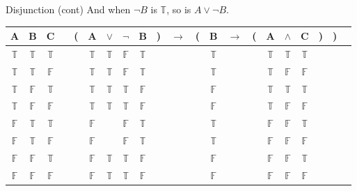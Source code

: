\documentclass[
  ignorenonframetext,
]{beamer}
\renewcommand{\,}{\text{, }}
\def\True{\mathbb{T}}
\def\False{\mathbb{F}}
\begin{document}
\begin{frame}{Disjunction (cont)}
\protect\hypertarget{disjunction-cont}{}
And when \(\neg B\) is \(\True\), so is \(A \vee \neg B\).

\begin{center}
\begin{tabular}{@{ }c@{ }@{ }c@{ }@{ }c | c@{ }@{}c@{}@{ }c@{ }@{ }c@{ }@{ }c@{ }@{ }c@{ }@{}c@{}@{ }c@{ }@{}c@{}@{ }c@{ }@{ }c@{ }@{}c@{}@{ }c@{ }@{ }c@{ }@{ }c@{ }@{}c@{}@{}c@{}@{ }c}
A & B & C &  & ( & A & $\vee$ & $\neg$ & B & ) & $\rightarrow$ & ( & B & $\rightarrow$ & ( & A & $\wedge$ & C & ) & ) & \\
\hline 
 $\True$ & $\True$ & $\True$ &  &  & $\True$ & $\True$ & $\False$ & $\True$ &  &&  & $\True$ &&  & $\True$ & $\True$ & $\True$ &  &  & \\
 $\True$ & $\True$ & $\False$ &  &  & $\True$ & $\True$ & $\False$ & $\True$ &  &&  & $\True$ &&  & $\True$ & $\False$ & $\False$ &  &  & \\
 $\True$ & $\False$ & $\True$ &  &  & $\True$ & $\True$ & $\True$ & $\False$ &  &&  & $\False$ &&  & $\True$ & $\True$ & $\True$ &  &  & \\
 $\True$ & $\False$ & $\False$ &  &  & $\True$ & $\True$ & $\True$ & $\False$ &  &&  & $\False$ &&  & $\True$ & $\False$ & $\False$ &  &  & \\
 $\False$ & $\True$ & $\True$ &  &  & $\False$ && $\False$ & $\True$ &  &&  & $\True$ &&  & $\False$ & $\False$ & $\True$ &  &  & \\
 $\False$ & $\True$ & $\False$ &  &  & $\False$ && $\False$ & $\True$ &  &&  & $\True$ &&  & $\False$ & $\False$ & $\False$ &  &  & \\
 $\False$ & $\False$ & $\True$ &  &  & $\False$ & $\True$ & $\True$ & $\False$ &  &&  & $\False$ &&  & $\False$ & $\False$ & $\True$ &  &  & \\
 $\False$ & $\False$ & $\False$ &  &  & $\False$ & $\True$ & $\True$ & $\False$ &  &&  & $\False$ &&  & $\False$ & $\False$ & $\False$ &  &  & \\
\end{tabular}
\end{center}
\end{frame}
\end{document}

